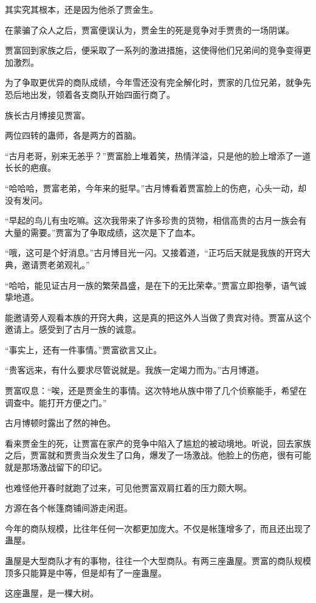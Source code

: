 \begin{this_body}
其实究其根本，还是因为他杀了贾金生。

在蒙骗了众人之后，贾富便误认为，贾金生的死是竞争对手贾贵的一场阴谋。

贾富回到家族之后，便采取了一系列的激进措施，这使得他们兄弟间的竞争变得更加激烈。

为了争取更优异的商队成绩，今年雪还没有完全解化时，贾家的几位兄弟，就争先恐后地出发，领着各支商队开始四面行商了。

族长古月博接见贾富。

两位四转的蛊师，各是两方的首脑。

“古月老哥，别来无恙乎？”贾富脸上堆着笑，热情洋溢，只是他的脸上增添了一道长长的疤痕。

“哈哈哈，贾富老弟，今年来的挺早。”古月博看着贾富脸上的伤疤，心头一动，却没有发问。

“早起的鸟儿有虫吃嘛。这次我带来了许多珍贵的货物，相信高贵的古月一族会有大量的需要。”贾富为了争取成绩，这次是下了血本。

“哦，这可是个好消息。”古月博目光一闪。又接着道，“正巧后天就是我族的开窍大典，邀请贾老弟观礼。”

“哈哈，能见证古月一族的繁荣昌盛，是在下的无比荣幸。”贾富立即抱拳，语气诚挚地道。

能邀请旁人观看本族的开窍大典，这是真的把这外人当做了贵宾对待。贾富从这个邀请上。感受到了古月一族的诚意。

“事实上，还有一件事情。”贾富欲言又止。

“贵客远来，有什么要求尽管说就是。我族一定竭力而为。”古月博道。

贾富叹息：“唉，还是贾金生的事情。这次特地从族中带了几个侦察能手，希望在调查中。能打开方便之门。”

古月博顿时露出了然的神色。

看来贾金生的死，让贾富在家产的竞争中陷入了尴尬的被动境地。听说，回去家族之后，贾富就和贾贵当众发生了口角，爆发了一场激战。他脸上的伤疤，很有可能就是那场激战留下的印记。

也难怪他开春时就跑了过来，可见他贾富双肩扛着的压力颇大啊。

方源在各个帐篷商铺间游走闲逛。

今年的商队规模，比往年任何一次都更加庞大。不仅是帐篷增多了，而且还出现了蛊屋。

蛊屋是大型商队才有的事物，往往一个大型商队。有两三座蛊屋。贾富的商队规模顶多只能算是中等，但是却有了一座蛊屋。

这座蛊屋，是一棵大树。


\end{this_body}
